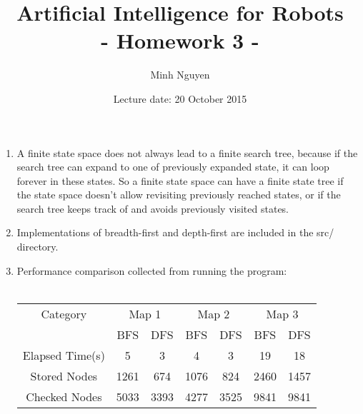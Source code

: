 \documentclass[a4paper, 12pt]{article}
\title{Artificial Intelligence for Robots \\
				- Homework 3 -}
\author{Minh Nguyen}
\date{Lecture date: 20 October 2015}
\begin{document}
\maketitle

\begin{enumerate}

	\item A finite state space does not always lead to a finite search tree,
    because if the search tree can expand to one of previously expanded state,
    it can loop forever in these states. So a finite state space can have a
    finite state tree if the state space doesn't allow revisiting previously
    reached states, or if the search tree keeps track of and avoids previously
    visited states.

	\item Implementations of breadth-first and depth-first are included in the
    src/ directory.

	\item Performance comparison collected from running the program:\\\\
        \begin{tabular}{*7c}
        \toprule
        Category        & \multicolumn{2}{c}{Map 1} & \multicolumn{2}{c}{Map 2} & \multicolumn{2}{c}{Map 3} \\
                        & BFS & DFS                 & BFS & DFS                 & BFS & DFS                 \\
        \midrule
        Elapsed Time(s) & 5   & 3                   & 4   & 3                   & 19  & 18                  \\
        Stored Nodes    & 1261& 674                 & 1076& 824                 & 2460& 1457                \\
        Checked Nodes   & 5033& 3393                & 4277& 3525                & 9841& 9841                \\
        \bottomrule
        \end{tabular}

\end{enumerate}

%
%
\end{document}

